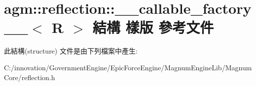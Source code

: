 \hypertarget{structagm_1_1reflection_1_1____callable__factory____}{}\section{agm\+:\+:reflection\+:\+:\+\_\+\+\_\+callable\+\_\+factory\+\_\+\+\_\+$<$ R $>$ 結構 樣版 參考文件}
\label{structagm_1_1reflection_1_1____callable__factory____}


此結構(structure) 文件是由下列檔案中產生\+:\begin{DoxyCompactItemize}
\item 
C\+:/innovation/\+Government\+Engine/\+Epic\+Force\+Engine/\+Magnum\+Engine\+Lib/\+Magnum\+Core/reflection.\+h\end{DoxyCompactItemize}
